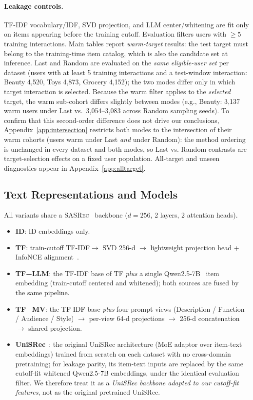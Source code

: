 \documentclass[sigconf,natbib=true,anonymous]{acmart}
\newcommand{\tfidf}{\textsc{TF-IDF}\xspace}
\newcommand{\tfllm}{\textsc{TF+LLM}\xspace}
\newcommand{\tfmv}{\textsc{TF+MV}\xspace}
\newcommand{\base}{\textsc{SASRec}\xspace}
\begin{document}
\paragraph{Leakage controls.}
\tfidf vocabulary/IDF, SVD projection, and LLM center/whitening are fit only on items appearing before the training cutoff.
Evaluation filters users with $\ge 5$ training interactions.
Main tables report \emph{warm-target} results: the test target must belong to the training-time item catalog, which is also the candidate set at inference.
Last and Random are evaluated on the \emph{same eligible-user set} per dataset (users with at least 5 training interactions and a test-window interaction: Beauty 4{,}520, Toys 4{,}873, Grocery 4{,}152); the two modes differ only in which target interaction is selected.
Because the warm filter applies to the \emph{selected} target, the warm sub-cohort differs slightly between modes (e.g., Beauty: 3{,}137 warm users under Last vs.\ 3{,}054--3{,}083 across Random sampling seeds).
To confirm that this second-order difference does not drive our conclusions, Appendix~\ref{app:intersection} restricts both modes to the intersection of their warm cohorts (users warm under Last \emph{and} under Random): the method ordering is unchanged in every dataset and both modes, so Last-vs.-Random contrasts are target-selection effects on a fixed user population.
All-target and unseen diagnostics appear in Appendix~\ref{app:alltarget}.

\subsection{Text Representations and Models}
\label{sec:models}

All variants share a \base~\cite{kang2018sasrec} backbone ($d{=}256$, 2 layers, 2 attention heads).

\begin{itemize}[leftmargin=*,itemsep=1pt]
\item \textbf{ID}: ID embeddings only.
\item \textbf{TF}: train-cutoff \tfidf $\to$ SVD 256-d $\to$ lightweight projection head + InfoNCE alignment~\cite{oord2018cpc}.
\item \textbf{\tfllm}: the \tfidf base of TF \emph{plus} a single Qwen2.5-7B~\cite{qwen2024qwen25} item embedding (train-cutoff centered and whitened); both sources are fused by the same pipeline.
\item \textbf{\tfmv}: the \tfidf base \emph{plus} four prompt views (Description / Function / Audience / Style) $\to$ per-view 64-d projections $\to$ 256-d concatenation $\to$ shared projection.
\item \textbf{UniSRec}~\cite{hou2022unisrec}: the original UniSRec architecture (MoE adaptor over item-text embeddings) trained from scratch on each dataset with no cross-domain pretraining; for leakage parity, its item-text inputs are replaced by the same cutoff-fit whitened Qwen2.5-7B embeddings, under the identical evaluation filter.  We therefore treat it as a \emph{UniSRec backbone adapted to our cutoff-fit features}, not as the original pretrained UniSRec.
\end{itemize}
\end{document}
